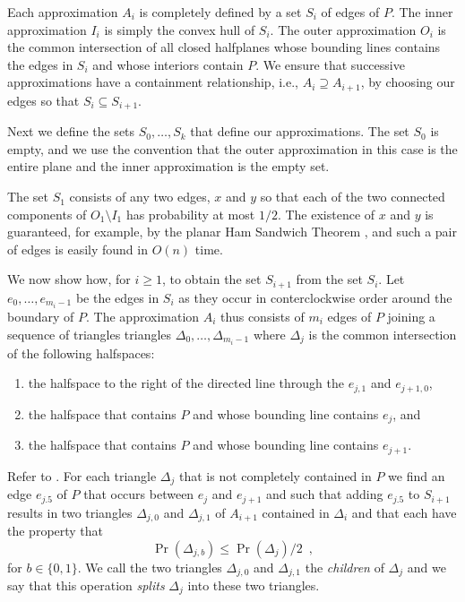 \documentclass[charterfonts,lotsofwhite]{patmorin}
\begin{document}
Each approximation $A_i$ is completely defined by a set $S_i$ of edges
of $P$.  The inner approximation $I_i$ is simply the convex hull of $S_i$.
The outer approximation $O_i$ is the common intersection of all closed
halfplanes whose bounding lines contains the edges in $S_i$ and whose
interiors contain $P$.  We ensure that successive approximations have
a containment relationship, i.e., $A_i\supseteq A_{i+1}$, by choosing
our edges so that $S_i\subseteq S_{i+1}$.

Next we define the sets $S_0,\ldots,S_k$ that define our
approximations.  The set $S_0$ is empty, and we use the convention
that the outer approximation in this case is the entire plane and the
inner approximation is the empty set. 

The set $S_1$ consists of any two edges, $x$ and $y$ so that each of
the two connected components of $O_1\setminus I_1$ has probability at
most $1/2$.  The existence of $x$ and $y$ is guaranteed, for example,
by the planar Ham Sandwich Theorem \cite{bz04}, and such a pair of
edges is easily found in $O(n)$ time.

We now show how, for $i\ge 1$, to obtain the set $S_{i+1}$ from the
set $S_{i}$.  Let $e_0,\ldots,e_{m_i-1}$ be the edges in $S_i$ as they
occur in conterclockwise order around the boundary of $P$.  The
approximation $A_i$ thus consists of $m_i$ edges of $P$ joining a
sequence of triangles triangles $\Delta_0,\ldots,\Delta_{m_i-1}$ where
$\Delta_j$ is the common intersection of the following halfspaces:

\begin{enumerate}
\item the halfspace to the right of the directed line through 
	the $e_{j,1}$ and $e_{j+1,0}$,
\item the halfspace that contains $P$ and whose bounding line contains
$e_j$, and
\item the halfspace that contains $P$ and whose bounding line contains
$e_{j+1}$.
\end{enumerate}

Refer to . For each triangle $\Delta_j$ that is not
completely contained in $P$ we find an edge $e_{j.5}$ of $P$ that
occurs between $e_j$ and $e_{j+1}$ and such that adding $e_{j.5}$ to
$S_{i+1}$ results in two triangles
$\Delta_{j,0}$ and $\Delta_{j,1}$ of $A_{i+1}$ contained in $\Delta_i$
and that each have the property that
\[  
     \Pr(\Delta_{j,b}) \le \Pr(\Delta_{j})/2 \enspace ,
\]
for $b\in\{0,1\}$.
We call the two triangles $\Delta_{j,0}$ and $\Delta_{j,1}$ the
\emph{children} of $\Delta_j$ and we say that this operation
\emph{splits} $\Delta_j$ into these two triangles.
\end{document}
